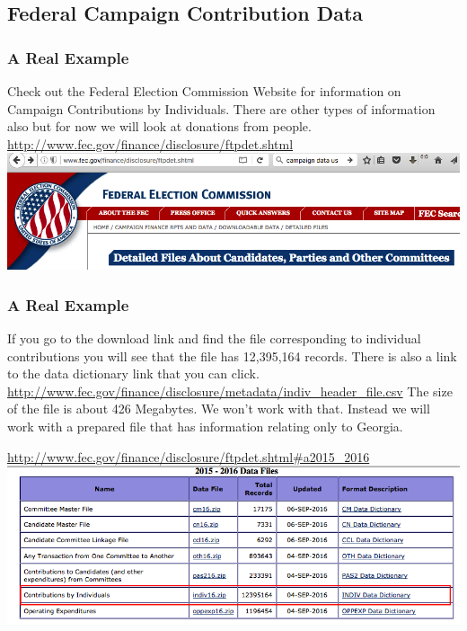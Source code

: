\documentclass{beamer}
\begin{document}
%

%
\subsection{Federal Campaign Contribution Data}
\begin{frame}[fragile]
\frametitle{A Real Example}Check out the Federal Election Commission Website for information on Campaign Contributions by Individuals. There are other types of information also but for now we will look at donations from people.
\newline
\\
\url{http://www.fec.gov/finance/disclosure/ftpdet.shtml}
\newline
\includegraphics{../IMG/election_website.png}
\end{frame}

% 

\begin{frame}[fragile]
\frametitle{A Real Example} If you go to the download link and find the file corresponding to individual contributions you will see that the file has 12,395,164 records. There is also a link to the data dictionary link that you can click.
\newline
\scriptsize
\url{http://www.fec.gov/finance/disclosure/metadata/indiv_header_file.csv}
\normalsize
The size of the file is about 426 Megabytes. We won't work with that. Instead we will work with a prepared file that has information relating only to Georgia. 

\footnotesize
\url{http://www.fec.gov/finance/disclosure/ftpdet.shtml#a2015_2016}
\newline
\includegraphics{../IMG/campaign.png}
\end{frame}
\end{document}
